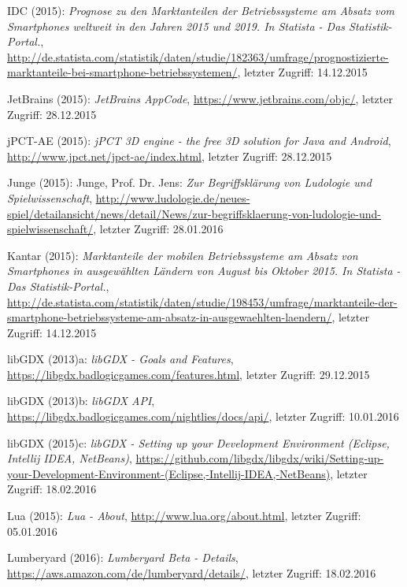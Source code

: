 \begin{thebibliography}{}
IDC (2015): \emph{Prognose zu den Marktanteilen der Betriebssysteme am Absatz vom Smartphones weltweit in den Jahren 2015 und 2019. In Statista - Das Statistik-Portal.},
\url{http://de.statista.com/statistik/daten/studie/182363/umfrage/prognostizierte-marktanteile-bei-smartphone-betriebssystemen/}, letzter Zugriff: 14.12.2015

JetBrains (2015): \emph{JetBrains AppCode},
\url{https://www.jetbrains.com/objc/}, letzter Zugriff: 28.12.2015

jPCT-AE (2015): \emph{jPCT 3D engine - the free 3D solution for Java and Android},
\url{http://www.jpct.net/jpct-ae/index.html}, letzter Zugriff: 28.12.2015

Junge (2015): Junge, Prof. Dr. Jens:
\emph{Zur Begriffsklärung von Ludologie und Spielwissenschaft},
\url{http://www.ludologie.de/neues-spiel/detailansicht/news/detail/News/zur-begriffsklaerung-von-ludologie-und-spielwissenschaft/}, letzter Zugriff: 28.01.2016

Kantar (2015): \emph{Marktanteile der mobilen Betriebssysteme am Absatz von Smartphones in ausgewählten Ländern von August bis Oktober 2015. In Statista - Das Statistik-Portal.},
\url{http://de.statista.com/statistik/daten/studie/198453/umfrage/marktanteile-der-smartphone-betriebssysteme-am-absatz-in-ausgewaehlten-laendern/}, letzter Zugriff: 14.12.2015

libGDX (2013)a: \emph{libGDX - Goals and Features},
\url{https://libgdx.badlogicgames.com/features.html}, letzter Zugriff: 29.12.2015

libGDX (2013)b: \emph{libGDX API},
\url{https://libgdx.badlogicgames.com/nightlies/docs/api/}, letzter Zugriff: 10.01.2016

libGDX (2015)c: \emph{libGDX - Setting up your Development Environment (Eclipse, Intellij IDEA, NetBeans)},
\url{https://github.com/libgdx/libgdx/wiki/Setting-up-your-Development-Environment-(Eclipse,-Intellij-IDEA,-NetBeans)}, letzter Zugriff: 18.02.2016

Lua (2015): \emph{Lua - About},
\url{http://www.lua.org/about.html}, letzter Zugriff: 05.01.2016

Lumberyard (2016): \emph{Lumberyard Beta - Details},
\url{https://aws.amazon.com/de/lumberyard/details/}, letzter Zugriff: 18.02.2016


\end{thebibliography}
